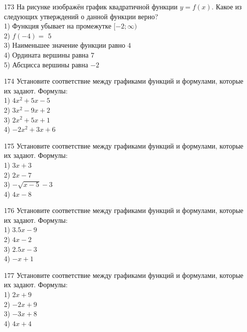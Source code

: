 \documentclass[4apaper]{article}
\begin{document}
\begin{taskBN}{173}
На рисунке изображён график квадратичной функции $y=f(x)$. Какое из следующих утверждений о данной функции верно?\\1) Функция убывает на промежутке $[-2; \infty)$\\2) $f(-4)=$ $5$\\3) Наименьшее значение функции равно  $4$\\4) Ордината вершины равна $7$\\5) Абсцисса вершины равна $-2$
\end{taskBN}

\begin{taskBN}{174}
Установите соответствие между графиками функций и формулами, которые их задают. Формулы: \\1) $4x^2+5x-5$\\2) $3x^2-9x+2$\\3) $2x^2+5x+1$\\4) $-2x^2+3x+6$
\end{taskBN}

\begin{taskBN}{175}
Установите соответствие между графиками функций и формулами, которые их задают. Формулы: \\1) $3x+3$\\2) $2x-7$\\3) $-\sqrt{x-5}-3$\\4) $4x-8$
\end{taskBN}

\begin{taskBN}{176}
Установите соответствие между графиками функций и формулами, которые их задают. Формулы: \\1) $3.5x-9$\\2) $4x-2$\\3) $2.5x-3$\\4) $-x+1$
\end{taskBN}

\begin{taskBN}{177}
Установите соответствие между графиками функций и формулами, которые их задают. Формулы: \\1) $2x+9$\\2) $-2x+9$\\3) $-3x+8$\\4) $4x+4$
\end{taskBN}
\end{document}
